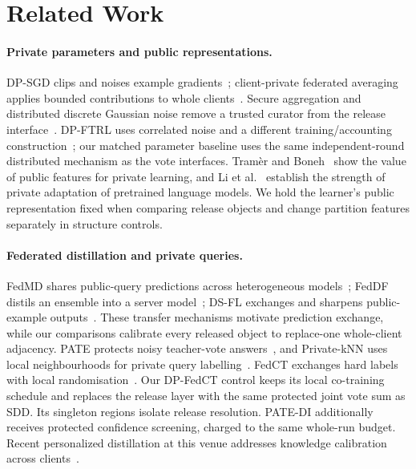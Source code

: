 \section{Related Work}
\label{sec:related}

\paragraph{Private parameters and public representations.}
DP-SGD clips and noises example gradients~\cite{abadi2016deep}; client-private
federated averaging applies bounded contributions to whole
clients~\cite{mcmahan2018learning,kairouz2021advances}.
Secure aggregation and distributed discrete Gaussian noise remove a trusted
curator from the release interface~\cite{bonawitz2017practical,kairouz2021distributed,canonne2020discrete}.
DP-FTRL uses correlated noise and a different training/accounting
construction~\cite{kairouz2021ftrl}; our matched parameter baseline uses the
same independent-round distributed mechanism as the vote interfaces.
Tram\`er and Boneh~\cite{tramer2021features} show the value of public features
for private learning, and Li et al.~\cite{li2022large} establish the strength
of private adaptation of pretrained language models. We hold the learner's
public representation fixed when comparing release objects and change
partition features separately in structure controls.

\paragraph{Federated distillation and private queries.}
FedMD shares public-query predictions across heterogeneous models~\cite{li2019fedmd};
FedDF distils an ensemble into a server model~\cite{lin2020feddf};
DS-FL exchanges and sharpens public-example outputs~\cite{itahara2021dsfl}.
These transfer mechanisms motivate prediction exchange, while our comparisons
calibrate every released object to replace-one whole-client adjacency.
PATE protects noisy teacher-vote answers~\cite{papernot2017semi,papernot2018scalable},
and Private-kNN uses local neighbourhoods for private query
labelling~\cite{zhu2020privateknn}. FedCT exchanges hard labels with local
randomisation~\cite{abourayya2025little}. Our DP-FedCT control keeps its local
co-training schedule and replaces the release layer with the same protected
joint vote sum as SDD. Its singleton regions isolate release resolution.
PATE-DI additionally receives protected confidence screening, charged to the
same whole-run budget. Recent personalized distillation at this venue addresses
knowledge calibration across clients~\cite{wang2026fedakd}.

